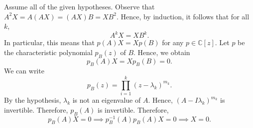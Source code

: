 \documentclass{article}
\begin{document}
\begin{solutions}
	Assume all of the given hypotheses. Observe that $A^{2}X = A(AX) = (AX)B = XB^{2}$. Hence, by induction, it follows that for all $k$, 
		\begin{equation}
			A^{k}X = XB^{k}. 
		\end{equation}
	In particular, this means that $p(A)X = Xp(B)$ for any $p \in \mathbb{C}[z]$. Let $p$ be the characteristic polynomial $p_{B}(z)$ of $B$. Hence, we obtain 
		\begin{equation}
			p_{B}(A)X = Xp_{B}(B) = 0. 
		\end{equation}
	We can write 
		\begin{equation}
			p_{B}(z) = \prod_{i=1}^{k}(z-\lambda_{k})^{m_{k}}. 
		\end{equation}
	By the hypothesis, $\lambda_{k}$ is not an eigenvalue of $A$. Hence, $(A - I\lambda_{k})^{m_{k}}$ is invertible. Therefore, $p_{B}(A)$ is invertible. Therefore, 
		\begin{equation}
			p_{B}(A)X = 0 \implies p_{B}^{-1}(A)p_{B}(A)X = 0 \implies X = 0. 
		\end{equation}
\end{solutions}
\end{document}
